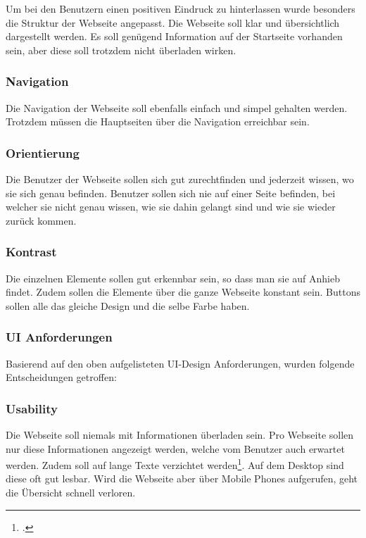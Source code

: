 Um bei den Benutzern einen positiven Eindruck zu hinterlassen wurde besonders die Struktur der Webseite angepasst. Die Webseite soll klar und übersichtlich dargestellt werden. Es soll genügend Information auf der Startseite vorhanden sein, aber diese soll trotzdem nicht überladen wirken.

\subsubsection*{Navigation}
Die Navigation der Webseite soll ebenfalls einfach und simpel gehalten werden. Trotzdem müssen die Hauptseiten über die Navigation erreichbar sein.

		
\subsubsection*{Orientierung}
Die Benutzer der Webseite sollen sich gut zurechtfinden und jederzeit wissen, wo sie sich genau befinden. Benutzer sollen sich nie auf einer Seite befinden, bei welcher sie nicht genau wissen, wie sie dahin gelangt sind und wie sie wieder zurück kommen.

\subsubsection*{Kontrast}
Die einzelnen Elemente sollen gut erkennbar sein, so dass man sie auf Anhieb findet. Zudem sollen die Elemente über die ganze Webseite konstant sein. Buttons sollen alle das gleiche Design und die selbe Farbe haben.

\subsubsection{UI Anforderungen}
Basierend auf den oben aufgelisteten UI-Design Anforderungen, wurden folgende Entscheidungen getroffen:

\subsubsection*{Usability}
Die Webseite soll niemals mit Informationen überladen sein. Pro Webseite sollen nur diese Informationen angezeigt werden, welche vom Benutzer auch erwartet werden. Zudem soll auf lange Texte verzichtet werden\footcite{usability}. Auf dem Desktop sind diese oft gut lesbar. Wird die Webseite aber über Mobile Phones aufgerufen, geht die Übersicht schnell verloren. \\

